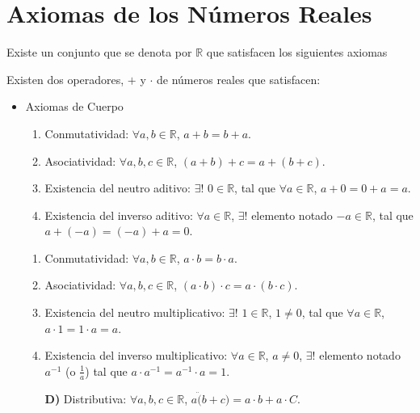 \documentclass[%
 aip,
 jmp,%
 amsmath,amssymb,
 reprint,%
]{revtex4-1}
\begin{document}
 



\section{Axiomas de los Números Reales}

Existe un conjunto que se denota por $\mathbb{R}$ que satisfacen los siguientes axiomas

Existen dos operadores, $+$ y $\cdot$ de números reales que satisfacen:
\begin{itemize}
\item Axiomas de Cuerpo
\begin{enumerate}[label=\bfseries S\arabic*)]
\item Conmutatividad: $\forall a,b \in \mathbb{R}$, $a+b=b+a$.
\item Asociatividad: $\forall a,b,c \in \mathbb{R}$, $(a+b)+c=a+(b+c)$.
\item Existencia del neutro aditivo: $\exists !$ $ 0 \in \mathbb{R}$, tal que $\forall a \in \mathbb{R}$, $a+0=0+a=a$.
\item Existencia del inverso aditivo: $\forall a \in \mathbb{R}$, $\exists !$ elemento notado $-a \in \mathbb{R}$, tal que $a+(-a)=(-a)+a=0$.
\end{enumerate}
\begin{enumerate}[label=\bfseries P\arabic*)]
\item Conmutatividad: $\forall a,b \in \mathbb{R}$, $a \cdot b = b \cdot a$.
\item Asociatividad: $\forall a,b,c \in \mathbb{R}$, $(a \cdot b)\cdot c=a \cdot (b \cdot c)$.
\item Existencia del neutro multiplicativo: $\exists !$ $ 1 \in \mathbb{R}$, $1\neq 0$, tal que $\forall a \in \mathbb{R}$, $a \cdot 1= 1 \cdot a = a$.
\item Existencia del inverso multiplicativo: $\forall a \in \mathbb{R}$, $a \neq 0$, $\exists !$ elemento notado $a^{-1}$ (o $\frac{1}{a}$) tal que $a \cdot a^{-1} = a^{-1} \cdot a = 1$.
\end{enumerate}
\begin{itemize}
\item[\bfseries D)] Distributiva: $\forall a,b,c \in \mathbb{R}$, $a \ddot (b+c) = a \cdot b + a \cdot C$.
\end{itemize}
\end{itemize}
\end{document}
